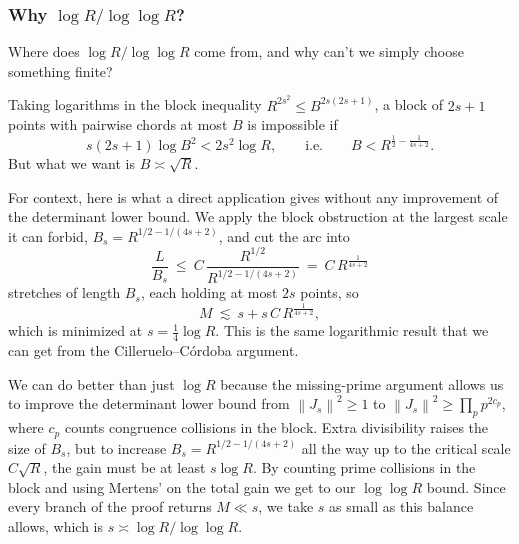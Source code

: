 \documentclass[11pt]{article}
\newcommand{\Norm}[1]{\left\lVert#1\right\rVert^2}
\begin{document}
\subsubsection*{Why \(\log R/\log\log R\)?}

Where does \(\log R/\log\log R\) come from, and why can't we simply choose something finite?

Taking logarithms in the block inequality \(R^{2s^2}\le B^{2s(2s+1)}\), a block of \(2s+1\) points with pairwise chords at most \(B\) is impossible if
\[
  s(2s+1)\log B^2<2s^2\log R,
  \qquad\text{i.e.}\qquad
  B<R^{\frac12-\frac{1}{4s+2}}.
\]
But what we want is \(B\asymp\sqrt R\).

For context, here is what a direct application gives without any improvement of the determinant lower bound.
We apply the block obstruction at the largest scale it can forbid, \(B_s=R^{1/2-1/(4s+2)}\), and cut the arc into
\[
  \frac{L}{B_s}\ \le\ C\,\frac{R^{1/2}}{R^{1/2-1/(4s+2)}}\ =\ C\,R^{\frac{1}{4s+2}}
\]
stretches of length \(B_s\), each holding at most \(2s\) points, so
\[
  M\ \lesssim\ s+s\,C\,R^{\frac{1}{4s+2}},
\]
which is minimized at \(s=\tfrac14\log R\).
This is the same logarithmic result that we can get from the Cilleruelo--C\'ordoba argument.

We can do better than just $\log R$ because the missing-prime argument allows us to improve the determinant lower bound from \(\Norm{J_s}\ge1\) to \(\Norm{J_s}\ge\prod_p p^{2c_p}\), where \(c_p\) counts congruence collisions in the block.
Extra divisibility raises the size of $B_s$, but to increase \(B_s=R^{1/2-1/(4s+2)}\) all the way up to the critical scale \(C\sqrt R\), the gain must be at least $s\log R$.
By counting prime collisions in the block and using Mertens' on the total gain we get to our $\log\log R$ bound.
Since every branch of the proof returns \(M\ll s\), we take \(s\) as small as this balance allows, which is \(s\asymp\log R/\log\log R\). 
\end{document}
